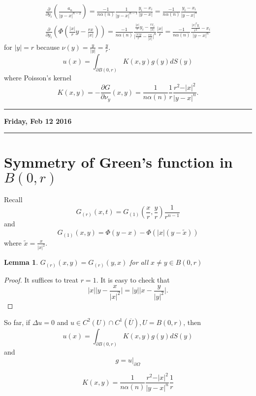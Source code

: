 \documentclass[11pt]{amsart}%
\newtheorem{lemma}[theorem]{Lemma}
\begin{document}
\begin{eqnarray*}
    \frac{\partial}{\partial y_i}(\frac{a_n}{\vert y-x\vert^{n-2}}) =\frac{-1}{n\alpha(n)}\frac{1}{\vert y-x\vert^{n-1}}\frac{y_i-x_i}{\vert y-x\vert} =\frac{-1}{n\alpha(n)}\frac{y_i-x_i}{\vert y-x\vert^n}\\
    \frac{\partial}{\partial y_i}(\Phi(\frac{\vert x\vert}{r}y-\frac{rx}{\vert x\vert})) =\frac{-1}{n\alpha(n)}\frac{\frac{\vert x\vert}{r}y_i -\frac{rx_i}{\vert x\vert}}{\vert \frac{\vert x\vert y}{r}-\frac{rx}{\vert x\vert}\vert^n}\frac{\vert x\vert}{r} = \frac{-1}{n\alpha(n)}\frac{\frac{\vert x\vert^2 y_i}{r^2}-x_i}{\vert y-x\vert^n}
\end{eqnarray*}
for $\vert y\vert =r$ because $\nu(y) =\frac{y}{\vert y\vert}=\frac{y}{r}$.
$$u(x)=\int_{\partial B(0,r)} K(x,y)g(y)dS(y)$$
where Poisson's kernel
$$K(x,y)=-\frac{\partial G}{\partial \nu_y}(x,y) =\frac{1}{n\alpha(n)}\frac{1}{r}\frac{r^2-\vert x\vert^2}{\vert y-x\vert^n}.$$

\begin{center}\rule{0.5\linewidth}{\linethickness}\end{center}

\textbf{Friday, Feb 12 2016}

\begin{center}\rule{0.5\linewidth}{\linethickness}\end{center}

\section*{Symmetry of Green's function in $B(0,r)$}
Recall $$G_{(r)}(x,t)=G_{(1)}(\frac{x}{r},\frac{y}{r})\frac{1}{r^{n-1}}$$ and
$$G_{(1)}(x,y)=\Phi(y-x) -\Phi(\vert x\vert (y-\tilde{x}))$$ where $\tilde{x}=\frac{x}{\vert x\vert^2}$.

\begin{lemma}
    $G_{(r)}(x,y)=G_{(r)}(y,x)$ for all $x\not=y\in B(0,r)$
\end{lemma}
\begin{proof}
    It suffices to treat $r=1$. It is easy to check that
    $$\vert x\vert \vert y-\frac{x}{\vert x\vert^2}\vert = \vert y\vert \vert x -\frac{y}{\vert y\vert^2}\vert.$$
\end{proof}

    So far, if $\Delta u=0$ and $u\in C^2(U)\cap C^1(\overline{U}), U=B(0,r)$, then
    \[u(x)=\int_{\partial B(0,r)} K(x,y)g(y)dS(y) \tag{P}\] and $$g=u\vert_{\partial \Omega}$$

$$K(x,y)=\frac{1}{n\alpha(n)}\frac{r^2-\vert x\vert^2}{\vert y-x\vert^n}\frac{1}{r}$$
\end{document}
